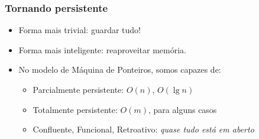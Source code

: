 \begin{frame}
    \frametitle{Tornando persistente}

    \begin{itemize}
        \item Forma mais trivial: guardar tudo!
        \item Forma mais inteligente: reaproveitar memória.
    \end{itemize}

    \begin{itemize}
        \item No modelo de Máquina de Ponteiros, somos capazes de:
        \begin{itemize}
            \item Parcialmente persistente: $O(n)$, $O(\lg n)$
            \item Totalmente persistente: $O(m)$, para alguns casos
            \item Confluente, Funcional, Retroativo: {\em quase tudo está em aberto}
        \end{itemize}
    \end{itemize}
\end{frame}